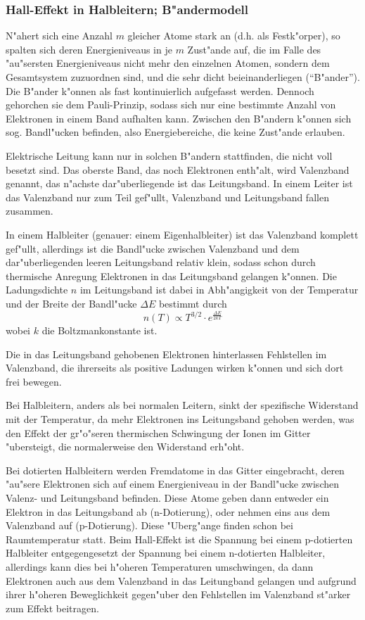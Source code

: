 \documentclass[a4paper,10pt]{article}
\begin{document}
\subsubsection*{Hall-Effekt in Halbleitern; B"andermodell}
N"ahert sich eine Anzahl $m$ gleicher Atome stark an (d.h. als Festk"orper), so spalten sich deren Energieniveaus in je $m$ Zust"ande auf, die im Falle des "au"sersten Energieniveaus nicht mehr den einzelnen Atomen, sondern dem Gesamtsystem zuzuordnen sind, und die sehr dicht beieinanderliegen (``B"ander''). Die B"ander k"onnen als fast kontinuierlich aufgefasst werden. Dennoch gehorchen sie dem Pauli-Prinzip, sodass sich nur eine bestimmte Anzahl von Elektronen in einem Band aufhalten kann. Zwischen den B"andern k"onnen sich sog. Bandl"ucken befinden, also Energiebereiche, die keine Zust"ande erlauben.

Elektrische Leitung kann nur in solchen B"andern stattfinden, die nicht voll besetzt sind. Das oberste Band, das noch Elektronen enth"alt, wird Valenzband genannt, das n"achste dar"uberliegende ist das Leitungsband. In einem Leiter ist das Valenzband nur zum Teil gef"ullt, Valenzband und Leitungsband fallen zusammen.

In einem Halbleiter (genauer: einem Eigenhalbleiter) ist das Valenzband komplett gef"ullt, allerdings ist die Bandl"ucke zwischen Valenzband und dem dar"uberliegenden leeren Leitungsband relativ klein, sodass schon durch thermische Anregung Elektronen in das Leitungsband gelangen k"onnen. Die Ladungsdichte $n$ im Leitungsband ist dabei in Abh"angigkeit von der Temperatur  und der Breite der Bandl"ucke $\Delta E$ bestimmt durch
\begin{equation}
n(T) \propto T^{3/2} \cdot e^{\frac{\Delta E}{2 k T}}
\end{equation}
wobei $k$ die Boltzmankonstante ist.

Die in das Leitungsband gehobenen Elektronen hinterlassen Fehlstellen im Valenzband, die ihrerseits als positive Ladungen wirken k"onnen und sich dort frei bewegen.

Bei Halbleitern, anders als bei normalen Leitern, sinkt der spezifische Widerstand mit der Temperatur, da mehr Elektronen ins Leitungsband gehoben werden, was den Effekt der gr"o"seren thermischen Schwingung der Ionen im Gitter "ubersteigt, die normalerweise den Widerstand erh"oht.

Bei dotierten Halbleitern werden Fremdatome in das Gitter eingebracht, deren "au"sere Elektronen sich auf einem Energieniveau in der Bandl"ucke zwischen Valenz- und Leitungsband befinden. Diese Atome geben dann entweder ein Elektron in das Leitungsband ab (n-Dotierung), oder nehmen eins aus dem Valenzband auf (p-Dotierung). Diese "Uberg"ange finden schon bei Raumtemperatur statt. Beim Hall-Effekt ist die Spannung bei einem p-dotierten Halbleiter entgegengesetzt der Spannung bei einem n-dotierten Halbleiter, allerdings kann dies bei h"oheren Temperaturen umschwingen, da dann Elektronen auch aus dem Valenzband in das Leitungband gelangen und aufgrund ihrer h"oheren Beweglichkeit gegen"uber den Fehlstellen im Valenzband st"arker zum Effekt beitragen.
\end{document}
